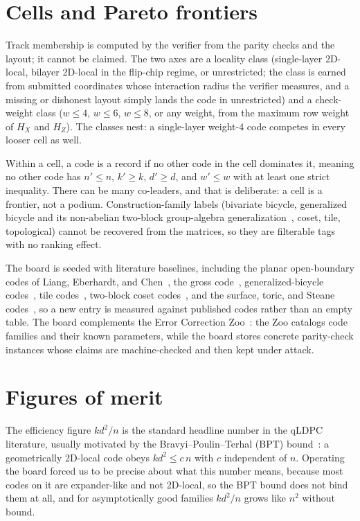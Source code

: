 \documentclass{ceurart}
\newcommand{\HX}{H_X}
\newcommand{\HZ}{H_Z}
\newcommand{\eff}{kd^2/n}
\begin{document}
\section{Cells and Pareto frontiers}

Track membership is computed by the verifier from the parity checks and the
layout; it cannot be claimed. The two axes are a locality class (single-layer
2D-local, bilayer 2D-local in the flip-chip regime, or unrestricted; the
class is earned from submitted coordinates whose interaction radius the
verifier measures, and a missing or dishonest layout simply lands the code in
unrestricted) and a check-weight class ($w\le 4$, $w\le 6$, $w\le 8$, or any
weight, from the maximum row weight of $\HX$ and $\HZ$). The classes nest: a
single-layer weight-4 code competes in every looser cell as well.

Within a cell, a code is a record if no other code in the cell dominates it,
meaning no other code has $n'\le n$, $k'\ge k$, $d'\ge d$, and $w'\le w$ with
at least one strict inequality. There can be many co-leaders, and that is
deliberate: a cell is a frontier, not a podium. Construction-family labels
(bivariate bicycle, generalized bicycle and its non-abelian two-block
group-algebra generalization~\cite{lin2024quantum}, coset, tile, topological)
cannot be recovered from the matrices, so they are filterable tags with no
ranking effect.

The board is seeded with literature baselines, including the planar
open-boundary codes of Liang, Eberhardt, and Chen~\cite{liang2025planar}, the
gross code~\cite{bravyi2024high}, generalized-bicycle
codes~\cite{panteleev2021degenerate,wang2022distance}, tile
codes~\cite{steffan2025tile}, two-block coset codes~\cite{aydin2026breaking},
and the surface, toric, and Steane
codes~\cite{kitaev2003fault,steane1996error}, so a new entry is measured
against published codes rather than an empty table. The board complements the
Error Correction Zoo~\cite{eczoo}: the Zoo catalogs code families and their
known parameters, while the board stores concrete parity-check instances whose
claims are machine-checked and then kept under attack.

\section{Figures of merit}
\label{sec:metrics}

The efficiency figure $\eff$ is the standard headline number in the qLDPC
literature, usually motivated by the Bravyi--Poulin--Terhal (BPT)
bound~\cite{bravyi2010tradeoffs}: a geometrically 2D-local code obeys
$kd^2 \le c\,n$ with $c$ independent of $n$. Operating the board forced us to
be precise about what this number means, because most codes on it are
expander-like and not 2D-local, so the BPT bound does not bind them at all,
and for asymptotically good families $\eff$ grows like $n^2$ without bound.
\end{document}

